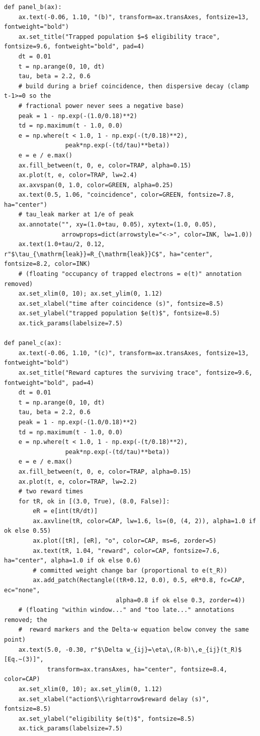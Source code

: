 \begin{lstlisting}[caption={schematics.ipynb code cell 4},label={lst:mrl-nb-schematics-4}]
def panel_b(ax):
    ax.text(-0.06, 1.10, "(b)", transform=ax.transAxes, fontsize=13, fontweight="bold")
    ax.set_title("Trapped population $=$ eligibility trace", fontsize=9.6, fontweight="bold", pad=4)
    dt = 0.01
    t = np.arange(0, 10, dt)
    tau, beta = 2.2, 0.6
    # build during a brief coincidence, then dispersive decay (clamp t-1>=0 so the
    # fractional power never sees a negative base)
    peak = 1 - np.exp(-(1.0/0.18)**2)
    td = np.maximum(t - 1.0, 0.0)
    e = np.where(t < 1.0, 1 - np.exp(-(t/0.18)**2),
                 peak*np.exp(-(td/tau)**beta))
    e = e / e.max()
    ax.fill_between(t, 0, e, color=TRAP, alpha=0.15)
    ax.plot(t, e, color=TRAP, lw=2.4)
    ax.axvspan(0, 1.0, color=GREEN, alpha=0.25)
    ax.text(0.5, 1.06, "coincidence", color=GREEN, fontsize=7.8, ha="center")
    # tau_leak marker at 1/e of peak
    ax.annotate("", xy=(1.0+tau, 0.05), xytext=(1.0, 0.05),
                arrowprops=dict(arrowstyle="<->", color=INK, lw=1.0))
    ax.text(1.0+tau/2, 0.12, r"$\tau_{\mathrm{leak}}=R_{\mathrm{leak}}C$", ha="center", fontsize=8.2, color=INK)
    # (floating "occupancy of trapped electrons = e(t)" annotation removed)
    ax.set_xlim(0, 10); ax.set_ylim(0, 1.12)
    ax.set_xlabel("time after coincidence (s)", fontsize=8.5)
    ax.set_ylabel("trapped population $e(t)$", fontsize=8.5)
    ax.tick_params(labelsize=7.5)

def panel_c(ax):
    ax.text(-0.06, 1.10, "(c)", transform=ax.transAxes, fontsize=13, fontweight="bold")
    ax.set_title("Reward captures the surviving trace", fontsize=9.6, fontweight="bold", pad=4)
    dt = 0.01
    t = np.arange(0, 10, dt)
    tau, beta = 2.2, 0.6
    peak = 1 - np.exp(-(1.0/0.18)**2)
    td = np.maximum(t - 1.0, 0.0)
    e = np.where(t < 1.0, 1 - np.exp(-(t/0.18)**2),
                 peak*np.exp(-(td/tau)**beta))
    e = e / e.max()
    ax.fill_between(t, 0, e, color=TRAP, alpha=0.15)
    ax.plot(t, e, color=TRAP, lw=2.2)
    # two reward times
    for tR, ok in [(3.0, True), (8.0, False)]:
        eR = e[int(tR/dt)]
        ax.axvline(tR, color=CAP, lw=1.6, ls=(0, (4, 2)), alpha=1.0 if ok else 0.55)
        ax.plot([tR], [eR], "o", color=CAP, ms=6, zorder=5)
        ax.text(tR, 1.04, "reward", color=CAP, fontsize=7.6, ha="center", alpha=1.0 if ok else 0.6)
        # committed weight change bar (proportional to e(t_R))
        ax.add_patch(Rectangle((tR+0.12, 0.0), 0.5, eR*0.8, fc=CAP, ec="none",
                               alpha=0.8 if ok else 0.3, zorder=4))
    # (floating "within window..." and "too late..." annotations removed; the
    #  reward markers and the Delta-w equation below convey the same point)
    ax.text(5.0, -0.30, r"$\Delta w_{ij}=\eta\,(R-b)\,e_{ij}(t_R)$  [Eq.~(3)]",
            transform=ax.transAxes, ha="center", fontsize=8.4, color=CAP)
    ax.set_xlim(0, 10); ax.set_ylim(0, 1.12)
    ax.set_xlabel("action$\\rightarrow$reward delay (s)", fontsize=8.5)
    ax.set_ylabel("eligibility $e(t)$", fontsize=8.5)
    ax.tick_params(labelsize=7.5)


\end{lstlisting}
